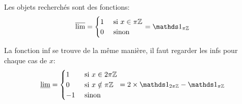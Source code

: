 {\begin{td-sol}[]
\begin{enumerate}
            Les objets recherchés sont des fonctions:
            \begin{equation*}
                \lims = \begin{cases}
                    1&\text{ si }x\in\pi\Z\\
                    0&\text{ sinon}
                \end{cases} = \one_{\pi\Z}
            \end{equation*}

            La fonction inf se trouve de la même manière, il faut regarder les infs pour chaque cas de \(x\):
            \begin{equation*}
                \limi = \begin{cases}
                    1&\text{ si }x\in2\pi\Z\\
                    0&\text{ si }x\notin\pi\Z\\
                    -1&\text{ sinon}
                \end{cases} = 2\times\one_{2\pi\Z} - \one_{\pi\Z}
            \end{equation*}

        \end{enumerate}
    \end{td-sol}
}{}

